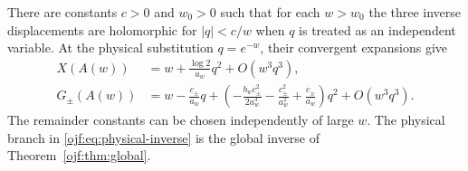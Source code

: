 \begin{theorem}
\label{ojf:thm:large-inverse}
There are constants $c>0$ and $w_0>0$ such that for each $w>w_0$ the
three inverse displacements are holomorphic for $|q|<c/w$ when
$q$ is treated as an independent variable. At the physical substitution
$q=e^{-w}$, their convergent expansions give
\begin{align}
 X(A(w))&=w+\frac{\log2}{a_w}q^2+O(w^3q^3),
                                            \label{ojf:eq:physical-inverse}\\
 G_\pm(A(w))&=w-\frac{c_\pm}{a_w}q+
 \left(-\frac{b_wc_\pm^2}{2a_w^3}
       -\frac{c_\pm^2}{a_w^2}+\frac{c_\pm}{a_w}\right)q^2
                   +O(w^3q^3).              \label{ojf:eq:lateral-inverse}
\end{align}
The remainder constants can be chosen independently of large $w$.
The physical branch in \eqref{ojf:eq:physical-inverse} is the global
inverse of Theorem~\ref{ojf:thm:global}.
\end{theorem}

